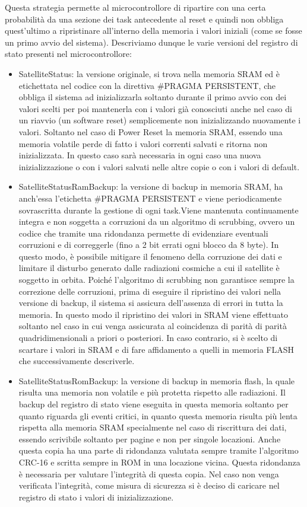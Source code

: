 \documentclass[LaM,binding=0.6cm]{../sapthesis}
\begin{document}
Questa strategia permette al microcontrollore di ripartire con una certa probabilità da una sezione dei task antecedente al reset e quindi non obbliga quest’ultimo a ripristinare all'interno della memoria i valori iniziali (come se fosse un primo avvio del sistema).
Descriviamo dunque le varie versioni del registro di stato presenti nel microcontrollore:
\begin{itemize}
    \item SatelliteStatus: la versione originale, si trova nella memoria SRAM ed è etichettata nel codice con la direttiva \#PRAGMA PERSISTENT, che obbliga il sistema ad inizializzarla soltanto durante il primo avvio con dei valori scelti per poi mantenerla con i valori già conosciuti anche nel caso di un riavvio (un software reset) semplicemente non inizializzando nuovamente i valori. 
    Soltanto nel caso di Power Reset la memoria SRAM, essendo una memoria volatile perde di fatto i valori correnti salvati e ritorna non inizializzata. In questo caso sarà necessaria in ogni caso una nuova inizializzazione o con i valori salvati nelle altre copie o con i valori di default.
    
    \item SatelliteStatusRamBackup: la versione di backup in memoria SRAM, ha anch’essa l’etichetta \#PRAGMA PERSISTENT e viene periodicamente sovrascritta durante la gestione di ogni task.Viene mantenuta continuamente integra e non soggetta a corruzioni da un algoritmo di scrubbing, ovvero un codice che tramite una ridondanza permette di evidenziare eventuali corruzioni e di correggerle (fino a 2 bit errati ogni blocco da 8 byte).
    In questo modo, è possibile mitigare il fenomeno della corruzione dei dati e limitare il disturbo generato dalle radiazioni cosmiche a cui il satellite è soggetto in orbita.
    Poiché l’algoritmo di scrubbing non garantisce sempre la correzione delle corruzioni, prima di eseguire il ripristino dei valori nella versione di backup, il sistema si assicura dell'assenza di errori in tutta la memoria. In questo modo il ripristino dei valori in SRAM viene effettuato soltanto nel caso in cui venga assicurata al coincidenza di parità di parità quadridimensionali a priori o posteriori. In caso contrario, si è scelto di scartare i valori in SRAM e di fare affidamento a quelli in memoria FLASH che successivamente descriverle.
    
    \item SatelliteStatusRomBackup: la versione di backup in memoria flash, la quale risulta una memoria non volatile e più protetta rispetto alle radiazioni. 
Il backup del registro di stato viene eseguita in questa memoria soltanto per quanto riguarda gli eventi critici, in quanto questa memoria risulta più lenta rispetta alla memoria SRAM specialmente nel caso di riscrittura dei dati, essendo scrivibile soltanto per pagine e non per singole locazioni.
Anche questa copia ha una parte di ridondanza valutata sempre tramite l’algoritmo CRC-16 e scritta sempre in ROM in una locazione vicina. Questa ridondanza è necessaria per valutare l’integrità di questa copia. Nel caso non venga verificata l’integrità, come misura di sicurezza si è deciso di caricare nel registro di stato i valori di inizializzazione.
\end{itemize}
\end{document}
